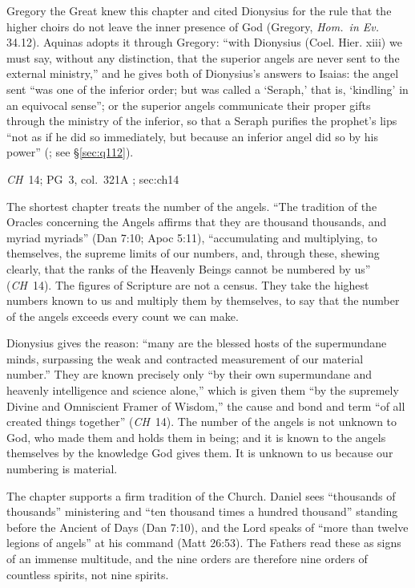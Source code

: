 Gregory the Great knew this chapter and cited Dionysius for the rule that
the higher choirs do not leave the inner presence of God (Gregory,
\emph{Hom.\ in Ev.} 34.12). Aquinas adopts it through Gregory: ``with
Dionysius (Coel. Hier. xiii) we must say, without any distinction, that
the superior angels are never sent to the external ministry,'' and he
gives both of Dionysius's answers to Isaias: the angel sent ``was one of
the inferior order; but was called a `Seraph,' that is, `kindling' in an
equivocal sense''; or the superior angels communicate their proper gifts
through the ministry of the inferior, so that a Seraph purifies the
prophet's lips ``not as if he did so immediately, but because an inferior
angel did so by his power'' (; see
\S\ref{sec:q112}).

{\emph{CH}~14; PG~3, col.~321A}
{; }{sec:ch14}

The shortest chapter treats the number of the angels. ``The tradition of
the Oracles concerning the Angels affirms that they are thousand
thousands, and myriad myriads'' (Dan 7:10; Apoc 5:11), ``accumulating and
multiplying, to themselves, the supreme limits of our numbers, and,
through these, shewing clearly, that the ranks of the Heavenly Beings
cannot be numbered by us'' (\emph{CH}~14). The figures of Scripture are
not a census. They take the highest numbers known to us and multiply
them by themselves, to say that the number of the angels exceeds every
count we can make.

Dionysius gives the reason: ``many are the blessed hosts of the
supermundane minds, surpassing the weak and contracted measurement of our
material number.'' They are known precisely only ``by their own
supermundane and heavenly intelligence and science alone,'' which is
given them ``by the supremely Divine and Omniscient Framer of Wisdom,''
the cause and bond and term ``of all created things together'' (\emph{CH}~14). The number of the angels is not unknown to God, who made them and
holds them in being; and it is known to the angels themselves by the
knowledge God gives them. It is unknown to us because our numbering is
material.

The chapter supports a firm tradition of the Church. Daniel sees
``thousands of thousands'' ministering and ``ten thousand times a hundred
thousand'' standing before the Ancient of Days (Dan 7:10), and the Lord
speaks of ``more than twelve legions of angels'' at his command (Matt
26:53). The Fathers read these as signs of an immense multitude, and the
nine orders are therefore nine orders of countless spirits, not nine
spirits.

